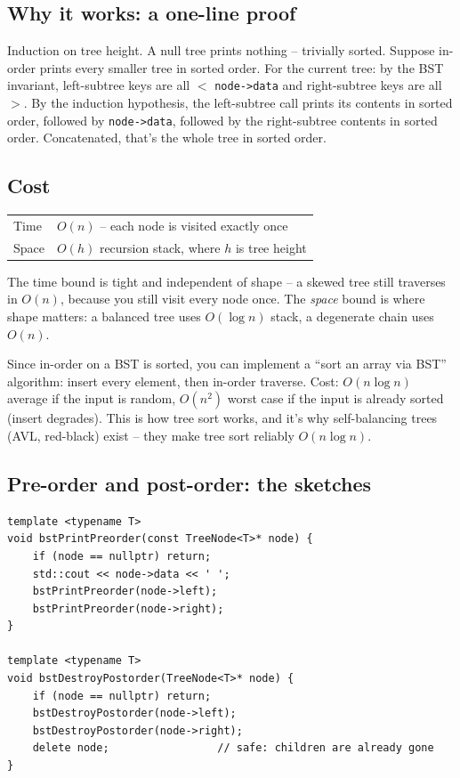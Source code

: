 \documentclass[11pt]{article}
\begin{document}
\subsection*{Why it works: a one-line proof}

Induction on tree height. A null tree prints nothing -- trivially sorted. Suppose in-order prints every smaller tree in sorted order. For the current tree: by the BST invariant, left-subtree keys are all $<$ \texttt{node->data} and right-subtree keys are all $>$. By the induction hypothesis, the left-subtree call prints its contents in sorted order, followed by \texttt{node->data}, followed by the right-subtree contents in sorted order. Concatenated, that's the whole tree in sorted order.

\subsection*{Cost}

\begin{center}
\begin{tabular}{ll}
Time  & $O(n)$ -- each node is visited exactly once \\
Space & $O(h)$ recursion stack, where $h$ is tree height \\
\end{tabular}
\end{center}

The time bound is tight and independent of shape -- a skewed tree still traverses in $O(n)$, because you still visit every node once. The \emph{space} bound is where shape matters: a balanced tree uses $O(\log n)$ stack, a degenerate chain uses $O(n)$.

\begin{notebox}
Since in-order on a BST is sorted, you can implement a ``sort an array via BST'' algorithm: insert every element, then in-order traverse. Cost: $O(n \log n)$ average if the input is random, $O(n^2)$ worst case if the input is already sorted (insert degrades). This is how tree sort works, and it's why self-balancing trees (AVL, red-black) exist -- they make tree sort reliably $O(n \log n)$.
\end{notebox}

\subsection*{Pre-order and post-order: the sketches}

\begin{lstlisting}
template <typename T>
void bstPrintPreorder(const TreeNode<T>* node) {
    if (node == nullptr) return;
    std::cout << node->data << ' ';
    bstPrintPreorder(node->left);
    bstPrintPreorder(node->right);
}

template <typename T>
void bstDestroyPostorder(TreeNode<T>* node) {
    if (node == nullptr) return;
    bstDestroyPostorder(node->left);
    bstDestroyPostorder(node->right);
    delete node;                 // safe: children are already gone
}
\end{lstlisting}
\end{document}
